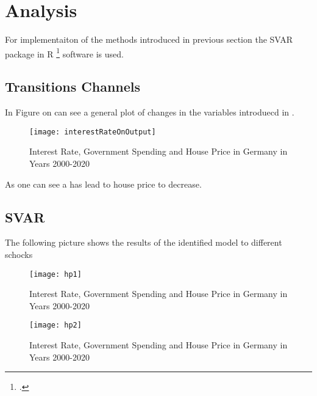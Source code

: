 \newpage
\section{Analysis} \label{analysis}

For implementaiton of the methods introduced in previous section the SVAR package in R \footcite[See.][]{Lange2020} software is used.
\subsection{Transitions Channels}
In Figure on can see a general plot of changes in the variables introduecd in .
\begin{figure}[H]
\caption{Interest Rate, Government Spending and House Price in Germany in Years 2000-2020}
\texttt{[image: interestRateOnOutput]}
\\
\cite[Quelle: Own Graph][]{FOM}
\end{figure}

As one can see a has lead to house price to decrease.

\subsection{SVAR}
The following picture shows the results of the identified model to different schocks
\begin{figure}[H]
\caption{Interest Rate, Government Spending and House Price in Germany in Years 2000-2020}
\texttt{[image: hp1]}
\\
\cite[Quelle: Own Graph][]{FOM}
\end{figure}
\begin{figure}[H]
\caption{Interest Rate, Government Spending and House Price in Germany in Years 2000-2020}
\texttt{[image: hp2]}
\\
\cite[Quelle: Own Graph][]{FOM}
\end{figure}


